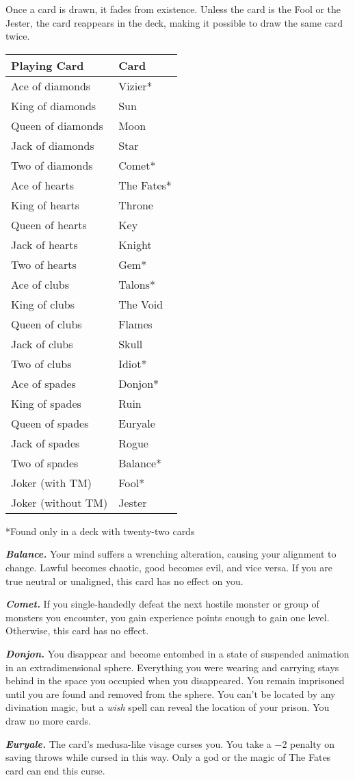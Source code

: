 \documentclass[
]{article}
\begin{document}
Once a card is drawn, it fades from existence. Unless the card is the
Fool or the Jester, the card reappears in the deck, making it possible
to draw the same card twice.

\begin{longtable}[]{@{}ll@{}}
\toprule
Playing Card & Card\tabularnewline
\midrule
\endhead
Ace of diamonds & Vizier*\tabularnewline
King of diamonds & Sun\tabularnewline
Queen of diamonds & Moon\tabularnewline
Jack of diamonds & Star\tabularnewline
Two of diamonds & Comet*\tabularnewline
Ace of hearts & The Fates*\tabularnewline
King of hearts & Throne\tabularnewline
Queen of hearts & Key\tabularnewline
Jack of hearts & Knight\tabularnewline
Two of hearts & Gem*\tabularnewline
Ace of clubs & Talons*\tabularnewline
King of clubs & The Void\tabularnewline
Queen of clubs & Flames\tabularnewline
Jack of clubs & Skull\tabularnewline
Two of clubs & Idiot*\tabularnewline
Ace of spades & Donjon*\tabularnewline
King of spades & Ruin\tabularnewline
Queen of spades & Euryale\tabularnewline
Jack of spades & Rogue\tabularnewline
Two of spades & Balance*\tabularnewline
Joker (with TM) & Fool*\tabularnewline
Joker (without TM) & Jester\tabularnewline
\bottomrule
\end{longtable}

*Found only in a deck with twenty-two cards

\emph{\textbf{Balance.}} Your mind suffers a wrenching alteration,
causing your alignment to change. Lawful becomes chaotic, good becomes
evil, and vice versa. If you are true neutral or unaligned, this card
has no effect on you.

\emph{\textbf{Comet.}} If you single-handedly defeat the next hostile
monster or group of monsters you encounter, you gain experience points
enough to gain one level. Otherwise, this card has no effect.

\emph{\textbf{Donjon.}} You disappear and become entombed in a state of
suspended animation in an extradimensional sphere. Everything you were
wearing and carrying stays behind in the space you occupied when you
disappeared. You remain imprisoned until you are found and removed from
the sphere. You can't be located by any divination magic, but a
\emph{wish} spell can reveal the location of your prison. You draw no
more cards.

\emph{\textbf{Euryale.}} The card's medusa-like visage curses you. You
take a −2 penalty on saving throws while cursed in this way. Only a god
or the magic of The Fates card can end this curse.
\end{document}
